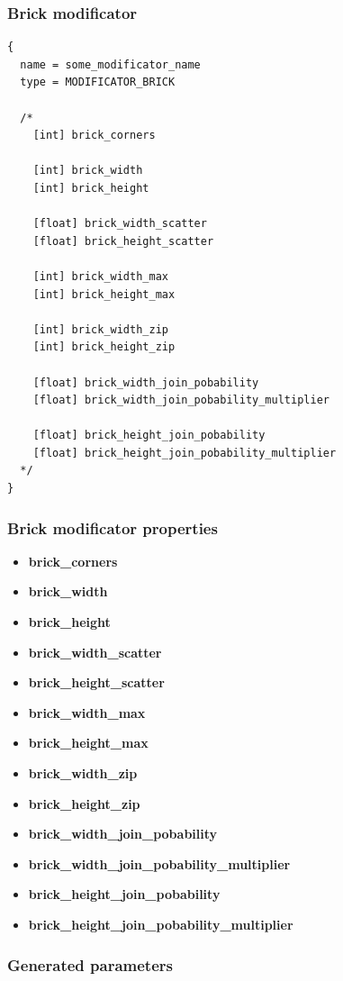 \documentclass[9pt]{article}
\begin{document}
\newpage
\subsubsection{Brick modificator}

\begin{verbatim}
{
  name = some_modificator_name
  type = MODIFICATOR_BRICK

  /*
    [int] brick_corners
        
    [int] brick_width
    [int] brick_height
        
    [float] brick_width_scatter
    [float] brick_height_scatter
        
    [int] brick_width_max
    [int] brick_height_max
        
    [int] brick_width_zip
    [int] brick_height_zip
        
    [float] brick_width_join_pobability
    [float] brick_width_join_pobability_multiplier
        
    [float] brick_height_join_pobability
    [float] brick_height_join_pobability_multiplier
  */
}
\end{verbatim}
\subsubsection*{Brick modificator properties}
\begin{itemize}
\item{\bf brick\_corners}
\item{\bf brick\_width}
\item{\bf brick\_height}
\item{\bf brick\_width\_scatter}
\item{\bf brick\_height\_scatter}
\item{\bf brick\_width\_max}
\item{\bf brick\_height\_max}
\item{\bf brick\_width\_zip}
\item{\bf brick\_height\_zip}
\item{\bf brick\_width\_join\_pobability}
\item{\bf brick\_width\_join\_pobability\_multiplier}
\item{\bf brick\_height\_join\_pobability}
\item{\bf brick\_height\_join\_pobability\_multiplier}
\end{itemize}

\subsubsection*{Generated parameters}
\end{document}
